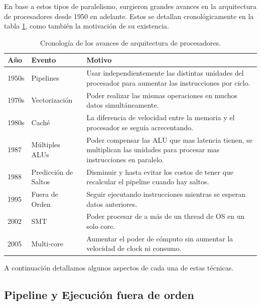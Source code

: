 En base a estos tipos de paralelismo, surgieron grandes avances en la arquitectura de procesadores desde 1950 en adelante.
Estos se detallan cronol\'ogicamente en la tabla \ref{tbl:historia-cpu}, como tambi\'en la motivaci\'on de su existencia.

\newcommand{\blap}[1]{\begin{minipage}[t]{3in}#1\end{minipage}}


\begin{table}[h]
\renewcommand{\arraystretch}{2.0}
\centering
\begin{tabular}{lll}
\hline
A\~no & Evento & Motivo \\ \hline
1950s & Pipelines &  \blap{Usar independientemente las distintas unidades del procesador para aumentar las instrucciones por ciclo.} \\
1970s & Vectorizaci\'on & \blap{Poder realizar las mismas operaciones en muchos datos simult\'aneamente.} \\
1980s & Cach\'e & \blap{La diferencia de velocidad entre la memoria y el procesador se segu\'ia acrecentando.} \\
1987 & M\'ultiples ALUs & \blap{Poder compensar las ALU que mas latencia tienen, se multiplican las unidades para procesar mas instrucciones en paralelo.} \\
1988 & Predicci\'on de Saltos & \blap{Disminuir y hasta evitar los costos de tener que recalcular el pipeline cuando hay saltos.} \\
1995 & Fuera de Orden & \blap{Seguir ejecutando instrucciones mientras se esperan datos anteriores.} \\
2002 & SMT & \blap{Poder procesar de a m\'as de un thread de OS en un solo core.} \\
2005 & Multi-core & \blap{Aumentar el poder de c\'omputo sin aumentar la velocidad de clock ni consumo.} \\
\end{tabular}
  \caption{Cronolog\'ia de los avances de arquitectura de procesadores.}
  \label{tbl:historia-cpu}
\end{table}

A continuaci\'on detallamos algunos aspectos de cada una de estas t\'ecnicas.

\subsection{Pipeline y Ejecuci\'on fuera de orden}

